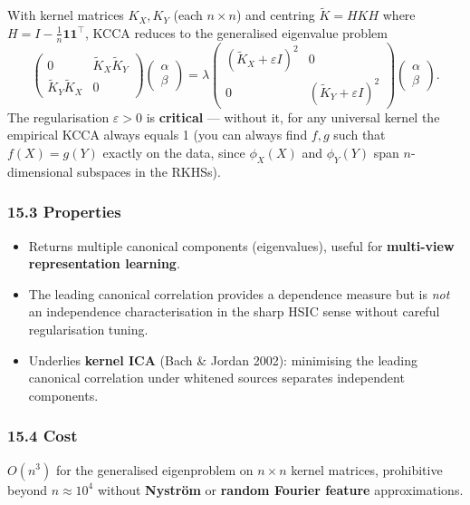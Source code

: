 \documentclass{article}
\providecommand{\tightlist}{\setlength{\itemsep}{0pt}\setlength{\parskip}{0pt}}
\begin{document}
With kernel matrices \(K_X, K_Y\) (each \(n \times n\)) and centring
\(\tilde{K} = HKH\) where
\(H = I - \tfrac{1}{n}\mathbf{1}\mathbf{1}^\top\), KCCA reduces to the
generalised eigenvalue problem \[
\begin{pmatrix} 0 & \tilde{K}_X \tilde{K}_Y \\ \tilde{K}_Y \tilde{K}_X & 0 \end{pmatrix} \!\!\begin{pmatrix} \alpha \\ \beta \end{pmatrix} = \lambda \begin{pmatrix} (\tilde{K}_X + \varepsilon I)^2 & 0 \\ 0 & (\tilde{K}_Y + \varepsilon I)^2 \end{pmatrix} \!\!\begin{pmatrix} \alpha \\ \beta \end{pmatrix}.
\] The regularisation \(\varepsilon > 0\) is \textbf{critical} ---
without it, for any universal kernel the empirical KCCA always equals 1
(you can always find \(f, g\) such that \(f(X) = g(Y)\) exactly on the
data, since \(\phi_X(X)\) and \(\phi_Y(Y)\) span \(n\)-dimensional
subspaces in the RKHSs).

\subsubsection{15.3 Properties}\label{153-properties}

\begin{itemize}
\tightlist
\item
  Returns multiple canonical components (eigenvalues), useful for
  \textbf{multi-view representation learning}.
\item
  The leading canonical correlation provides a dependence measure but is
  \emph{not} an independence characterisation in the sharp HSIC sense
  without careful regularisation tuning.
\item
  Underlies \textbf{kernel ICA} (Bach \& Jordan 2002): minimising the
  leading canonical correlation under whitened sources separates
  independent components.
\end{itemize}

\subsubsection{15.4 Cost}\label{154-cost}

\(O(n^3)\) for the generalised eigenproblem on \(n \times n\) kernel
matrices, prohibitive beyond \(n \approx 10^4\) without \textbf{Nyström}
or \textbf{random Fourier feature} approximations.
\end{document}
